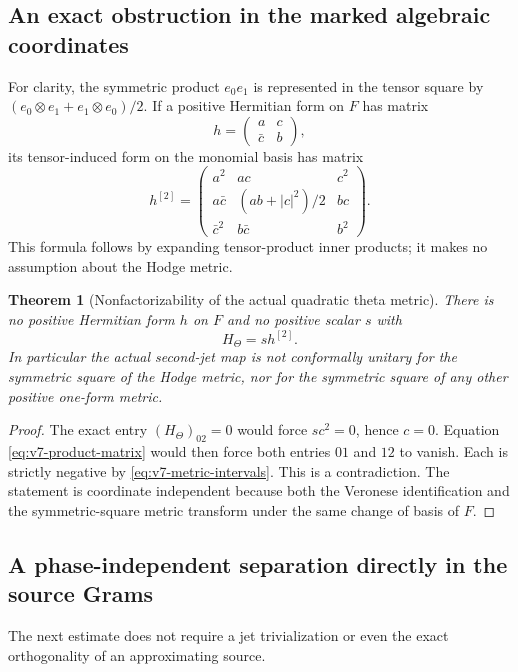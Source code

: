 \documentclass[11pt]{article}
\newtheorem{theorem}{Theorem}[section]
\theoremstyle{definition}
\theoremstyle{remark}
\begin{document}
\subsection{An exact obstruction in the marked algebraic coordinates}
For clarity, the symmetric product $e_0e_1$ is represented in the tensor square
by $(e_0\otimes e_1+e_1\otimes e_0)/2$. If a positive Hermitian form on
$F$ has matrix
\[
 h=\begin{pmatrix}a&c\\\bar c&b\end{pmatrix},
\]
its tensor-induced form on the monomial basis has matrix
\begin{equation}
 h^{[2]}=
 \begin{pmatrix}
 a^2&ac&c^2\\
 a\bar c&(ab+|c|^2)/2&bc\\
 \bar c^2&b\bar c&b^2
 \end{pmatrix}.
 \label{eq:v7-product-matrix}
\end{equation}
This formula follows by expanding tensor-product inner products; it makes no
assumption about the Hodge metric.

\begin{theorem}[Nonfactorizability of the actual quadratic theta metric]
\label{thm:v7-nonproduct}
There is no positive Hermitian form $h$ on $F$ and no positive scalar $s$ with
\begin{equation}
 \boxed{H_\Theta=s h^{[2]}.}
 \label{eq:v7-forbidden-product}
\end{equation}
In particular the actual second-jet map is not conformally unitary for the
symmetric square of the Hodge metric, nor for the symmetric square of any
other positive one-form metric.
\end{theorem}
\begin{proof}
The exact entry $(H_\Theta)_{02}=0$ would force $sc^2=0$, hence $c=0$.
Equation \eqref{eq:v7-product-matrix} would then force both entries $01$ and
$12$ to vanish. Each is strictly negative by
\eqref{eq:v7-metric-intervals}. This is a contradiction. The statement is
coordinate independent because both the Veronese identification and the
symmetric-square metric transform under the same change of basis of $F$.
\end{proof}

\subsection{A phase-independent separation directly in the source Grams}
The next estimate does not require a jet trivialization or even the exact
orthogonality of an approximating source.
\end{document}
